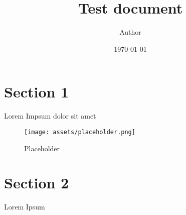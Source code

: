 \documentclass[11pt]{article}
\title{ Test document}
\author{ Author }
\date{\today}
\begin{document}
\maketitle
\pagebreak

\tableofcontents
\pagebreak


\section{Section 1}

Lorem Impsum dolor sit amet
\begin{figure}[h]
    \centering
    \texttt{[image: assets/placeholder.png]}
    \caption{Placeholder}
\end{figure}

\pagebreak
\section{Section 2}
Lorem Ipsum \\

\end{document}
